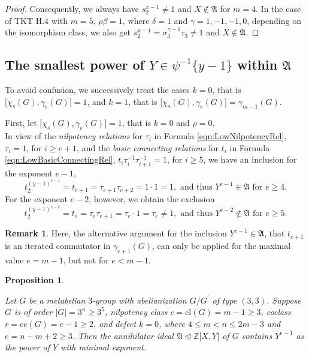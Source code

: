 \documentclass{amsart}
\newtheorem{proposition}{Proposition}[section]
\theoremstyle{definition}
\newtheorem{remark}{Remark}[section]
\numberwithin{equation}{section}
\begin{document}
\begin{proof}
\noindent
Consequently, we always have \(s_2^{x-1}\ne 1\) and \(X\not\in\mathfrak{A}\) for \(m=4\).
In the case of TKT H.4 with \(m=5\), \(\rho\beta=1\),
where \(\delta=1\) and \(\gamma=1,-1,-1,0\), depending on the isomorphism class,
we also get \(s_2^{x-1}=\sigma_3^{\gamma-1}\tau_3\ne 1\) and \(X\not\in\mathfrak{A}\).
\end{proof}



\subsection{The smallest power of \(Y\in\psi^{-1}\lbrace y-1\rbrace\) within \(\mathfrak{A}\)}
\label{ss:LowPowY}

To avoid confusion, we successively treat the cases
\(k=0\), that is \(\lbrack\chi_s(G),\gamma_e(G)\rbrack=1\), and
\(k=1\), that is \(\lbrack\chi_s(G),\gamma_e(G)\rbrack=\gamma_{m-1}(G)\).

First, let \(\lbrack\chi_s(G),\gamma_e(G)\rbrack=1\), that is \(k=0\) and \(\rho=0\).\\
In view of the \textit{nilpotency relations} for \(\tau_i\) in Formula
\eqref{eqn:LowNilpotencyRel},
\(\tau_i=1\), for \(i\ge e+1\),
and the \textit{basic connecting relations} for \(t_i\) in Formula
\eqref{eqn:LowBasicConnectingRel},
\(t_i\tau_i^{-1}\tau_{i+1}^{-1}=1\), for \(i\ge 5\),
we have an inclusion for the exponent \(e-1\),
\[t_2^{(y-1)^{e-1}}=t_{e+1}=\tau_{e+1}\tau_{e+2}=1\cdot 1=1, \text{ and thus } Y^{e-1}\in\mathfrak{A} \text{ for } e\ge 4.\]
For the exponent \(e-2\), however, we obtain the exclusion
\[t_2^{(y-1)^{e-2}}=t_e=\tau_e\tau_{e+1}=\tau_e\cdot 1=\tau_e\ne 1, \text{ and thus } Y^{e-2}\not\in\mathfrak{A} \text{ for } e\ge 5.\]

\begin{remark}
\label{rmk:LowPowY}
Here, the alternative argument for the inclusion \(Y^{e-1}\in\mathfrak{A}\),
that \(t_{e+1}\) is an iterated commutator in \(\gamma_{e+1}(G)\),
can only be applied for the maximal value \(e=m-1\), but not for \(e<m-1\).
\end{remark}

\begin{proposition}
\label{prp:LowPowY}

Let \(G\) be a metabelian \(3\)-group with abelianization \(G/G^\prime\) of type \((3,3)\).
Suppose \(G\) is of order \(\lvert G\rvert=3^n\ge 3^5\), nilpotency class \(c=\mathrm{cl}(G)=m-1\ge 3\), coclass \(r=\mathrm{cc}(G)=e-1\ge 2\),
and defect \(k=0\), where \(4\le m<n\le 2m-3\) and \(e=n-m+2\ge 3\).
Then the annihilator ideal \(\mathfrak{A}\unlhd\mathbb{Z}\lbrack X,Y\rbrack\) of \(G\)
contains \(Y^{e-1}\) as the power of \(Y\) with minimal exponent.

\end{proposition}
\end{document}

